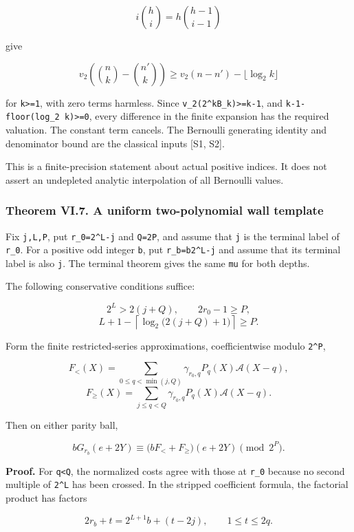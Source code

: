 \documentclass[11pt,letterpaper]{article}
\begin{document}
\[
i\binom hi=h\binom{h-1}{i-1}
\]

give

\[
v_2\left(\binom nk-\binom{n'}k\right)
\ge v_2(n-n')-\lfloor\log_2k\rfloor
\]

for \texttt{k\textgreater{}=1}, with zero terms harmless. Since \texttt{v\_2(2\^{}kB\_k)\textgreater{}=k-1}, and \texttt{k-1-floor(log\_2\ k)\textgreater{}=0}, every difference in the finite expansion has the required valuation. The constant term cancels. The Bernoulli generating identity and denominator bound are the classical inputs {[}S1, S2{]}.

This is a finite-precision statement about actual positive indices. It does not assert an undepleted analytic interpolation of all Bernoulli values.

\subsubsection{Theorem VI.7. A uniform two-polynomial wall template}\label{theorem-vi.7.-a-uniform-two-polynomial-wall-template}

Fix \texttt{j,L,P}, put \texttt{r\_0=2\^{}L-j} and \texttt{Q=2P}, and assume that \texttt{j} is the terminal label of \texttt{r\_0}. For a positive odd integer \texttt{b}, put \texttt{r\_b=b2\^{}L-j} and assume that its terminal label is also \texttt{j}. The terminal theorem gives the same \texttt{mu} for both depths.

The following conservative conditions suffice:

\[
2^L>2(j+Q),\qquad 2r_0-1\ge P,
\] \[
L+1-\left\lceil\log_2\bigl(2(j+Q)+1\bigr)\right\rceil\ge P.
\tag{VI.12}
\]

Form the finite restricted-series approximations, coefficientwise modulo \texttt{2\^{}P},

\[
F_{<}(X)=\sum_{0\le q<\min(j,Q)}
\gamma_{r_0,q}P_q(X)\mathscr A(X-q),
\] \[
F_{\ge}(X)=\sum_{j\le q<Q}
\gamma_{r_0,q}P_q(X)\mathscr A(X-q).
\]

Then on either parity ball,

\[
\boxed{
bG_{r_b}(e+2Y)
\equiv
\bigl(bF_<+F_{\ge}\bigr)(e+2Y)
\pmod{2^P}.
} \tag{VI.13}
\]

\textbf{Proof.} For \texttt{q\textless{}Q}, the normalized costs agree with those at \texttt{r\_0} because no second multiple of \texttt{2\^{}L} has been crossed. In the stripped coefficient formula, the factorial product has factors

\[
2r_b+t=2^{L+1}b+(t-2j),\qquad 1\le t\le2q.
\]
\end{document}
